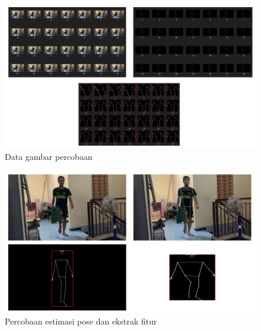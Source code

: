 \begin{figure} [ht] \centering
    \includegraphics[scale=0.48]{gambar/dataset.png}
    \caption{Data gambar percobaan}
    \label{fig:Dataset}
\end{figure}

\begin{figure} [ht] \centering
    \includegraphics[scale=0.48]{gambar/estimasi ekstrak.png}
    \caption{Percobaan estimasi pose dan ekstrak fitur}
    \label{fig:EstimasiEkstrak}
\end{figure}
